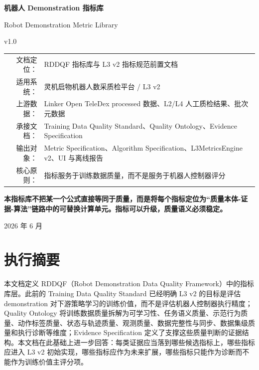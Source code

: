 \documentclass[UTF8,zihao=-4]{ctexart}
\begin{document}
\begin{titlepage}
\centering
\vspace*{2.2cm}
{\Huge\bfseries 机器人 Demonstration 指标库\par}
\vspace{0.35cm}
{\Large Robot Demonstration Metric Library\par}
\vspace{0.6cm}
{\LARGE v1.0\par}
\vspace{1.15cm}
\begin{tabular}{rl}
文档定位： & RDDQF 指标库与 L3 v2 指标规范前置文档 \\
适用系统： & 灵机启物机器人数采质检平台 / L3 v2 \\
上游数据： & Linker Open TeleDex processed 数据、L2/L4 人工质检结果、批次元数据 \\
承接文档： & Training Data Quality Standard、Quality Ontology、Evidence Specification \\
输出对象： & Metric Specification、Algorithm Specification、L3MetricsEngine v2、UI 与离线报告 \\
核心原则： & 指标服务于训练数据质量，而不是服务于机器人控制器评分 \\
\end{tabular}
\vfill
\begin{minipage}{0.88\linewidth}
\centering\large\bfseries
本指标库不把某一个公式直接等同于质量，而是将每个指标定位为“质量本体-证据-算法”链路中的可替换计算单元。指标可以升级，质量语义必须稳定。
\end{minipage}
\vfill
{\large 2026 年 6 月\par}
\end{titlepage}

\tableofcontents
\newpage

\section*{执行摘要}

本文档定义 RDDQF（Robot Demonstration Data Quality Framework）中的指标库层。此前的 Training Data Quality Standard 已经明确 L3 v2 的目标是评估 demonstration 对下游策略学习的训练价值，而不是评估机器人控制器执行精度；Quality Ontology 将训练数据质量拆解为可学习性、任务语义质量、示范行为质量、动作标签质量、状态与轨迹质量、观测质量、数据完整性与同步、数据集级质量和执行诊断等维度；Evidence Specification 定义了支撑这些质量判断的证据结构。本文档在此基础上进一步回答：每类证据应当落到哪些候选指标上，哪些指标应进入 L3 v2 初始实现，哪些指标应作为未来扩展，哪些指标只能作为诊断而不能作为训练价值主评分项。
\end{document}
